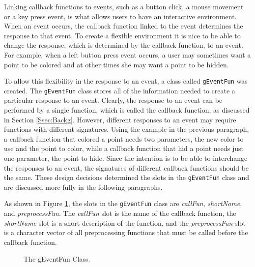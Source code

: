 \documentclass{article}[11pt]
\newcommand{\Robject}[1]{{\texttt{#1}}}
\newcommand{\Rslot}[1]{\textsl{#1}}
\begin{document}
Linking callback functions to events, such as a button click, a mouse movement
or a key press event, is what allows users to have an interactive
environment.  When an event occurs, the callback function linked to the event
determines the response to that event.  To create a flexible environment
it is nice to be able to change the response, which is determined by the
callback function, to an event.  For example, when a left button press event
occurs, a user may sometimes want a point to be colored and at other times she
may want a point to be hidden.  

To allow this flexibility in the response to an event, a class called
\Robject{gEventFun} was created.  The \Robject{gEventFun} class stores all of
the information needed to create a particular response to an event.
Clearly, the response to an event can be performed by a single function,
which is called the callback function, as discussed in Section
\ref{Ssec:Backg}.  However, different responses to an event may require
functions with different signatures.  Using the example in the previous
paragraph, a callback function that colored a point needs two parameters,
the new color to use and the point to color, while a callback function that
hid a point needs just one parameter, the point to hide.  Since the
intention is to be able to interchange the responses to an event, the
signatures of different callback functions should be the same.  These design
decisions determined the slots in the \Robject{gEventFun} class and are
discussed more fully in the following paragraphs. 

As shown in Figure \ref{Fig:EventFun}, the slots in the \Robject{gEventFun}
class are \Rslot{callFun}, \Rslot{shortName}, and \Rslot{preprocessFun}.  The
\Rslot{callFun} slot is the name of the callback function, the
\Rslot{shortName} slot is a short description of the function, and the
\Rslot{preprocessFun} slot is a character vector of all preprocessing
functions that must be called before the callback function.

\begin{figure}[ht]
  \begin{center}
    \caption{ The gEventFun Class. }
    \label{Fig:EventFun}
  \end{center}
\end{figure}
\end{document}
